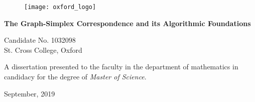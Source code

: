 \begin{titlepage}
	\vspace*{2cm}
	\begin{figure}
		\centering 
		\texttt{[image: oxford\_logo]}
	\end{figure}
	
	\begin{center}
		\begin{adjustwidth}{7em}{7em}
			\centering 
					{\bf \large The Graph-Simplex Correspondence and its Algorithmic Foundations}\\
			\end{adjustwidth}
		\vspace{4cm}
		Candidate No. 1032098\\
		St. Cross College, Oxford
		\vspace{1cm}
		\begin{adjustwidth}{7.5em}{7.5em}
			\centering 
					A dissertation presented to the faculty in the department of mathematics in candidacy for the degree of \emph{Master of Science}.
			\end{adjustwidth}
		\vspace{2cm}
		September, 2019
	\end{center}
\end{titlepage}